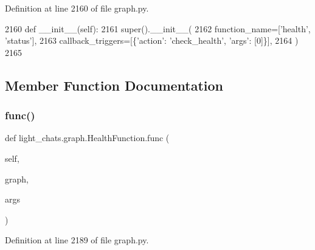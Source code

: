 Definition at line 2160 of file graph.\+py.


\begin{DoxyCode}
2160     \textcolor{keyword}{def }\_\_init\_\_(self):
2161         super().\_\_init\_\_(
2162             function\_name=[\textcolor{stringliteral}{'health'}, \textcolor{stringliteral}{'status'}],
2163             callback\_triggers=[\{\textcolor{stringliteral}{'action'}: \textcolor{stringliteral}{'check\_health'}, \textcolor{stringliteral}{'args'}: [0]\}],
2164         )
2165 
\end{DoxyCode}


\subsection{Member Function Documentation}
\mbox{\label{classlight__chats_1_1graph_1_1HealthFunction_aa79079c84c63fb936ef8ed5afa5bafca}} 
\subsubsection{\texorpdfstring{func()}{func()}}
{\footnotesize\ttfamily def light\+\_\+chats.\+graph.\+Health\+Function.\+func (\begin{DoxyParamCaption}\item[{}]{self,  }\item[{}]{graph,  }\item[{}]{args }\end{DoxyParamCaption})}



Definition at line 2189 of file graph.\+py.


